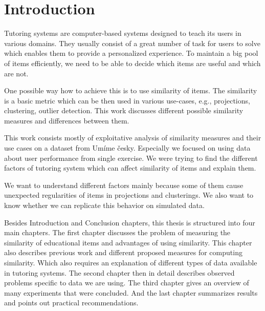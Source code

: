 \documentclass[
  printed, %
  table,   %
  nolof,     %
  nolot,     %
  color,
  final,
  nocover
]{fithesis3}
\begin{document}
\newcommand{\ppl}[1]{\textcolor[rgb]{0.6,0.2,1.0}{#1}}
\newcommand{\umimeCesky}{Umíme česky}
\newcommand{\cviceniB}{``Vyjmenovaná slova po B''}




\chapter*{Introduction}


Tutoring systems are computer-based systems designed to teach its users in various domains. They usually consist of a great number of task for users to solve which enables them to provide a personalized experience. To maintain a big pool of items efficiently, we need to be able to decide which items are useful and which are not.


One possible way how to achieve this is to use similarity of items. The similarity is a basic metric which can be then used in various use-cases, e.g., projections, clustering, outlier detection. This work discusses different possible similarity measures and differences between them.


This work consists mostly of exploitative analysis of similarity measures and their use cases on a dataset from \umimeCesky{}. Especially we focused on using data about user performance from single exercise. We were trying to find the different factors of tutoring system which can affect similarity of items and explain them.


We want to understand different factors mainly because some of them cause unexpected regularities of items in projections and clusterings. We also want to know whether we can replicate this behavior on simulated data.


Besides Introduction and Conclusion chapters, this thesis is structured into four main chapters. The first chapter discusses the problem of measuring the similarity of educational items and advantages of using similarity. This chapter also describes previous work and different proposed measures for computing similarity. Which also requires an explanation of different types of data available in tutoring systems. The second chapter then in detail describes observed problems specific to data we are using. The third chapter gives an overview of many experiments that were concluded. And the last chapter summarizes results and points out practical recommendations.
\end{document}
